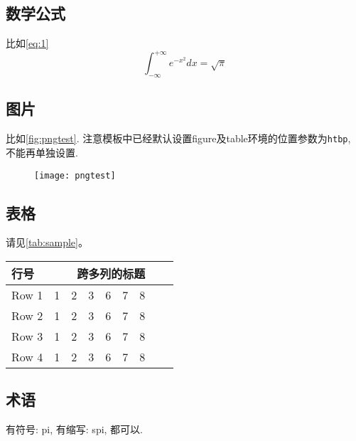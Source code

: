 \subsection{数学公式}

比如\autoref{eq:1}
\begin{equation}
    \label{eq:1}
    \int_{-\infty}^{+\infty} e^{-x^2} dx = \sqrt{\pi}
\end{equation}

\subsection{图片}

比如\autoref{fig:pngtest}. 注意模板中已经默认设置figure及table环境的位置参数为\verb|htbp|, 不能再单独设置.
\begin{figure}
    \centering
    \texttt{[image: pngtest]}
    \label{fig:pngtest}
\end{figure}

\subsection{表格}

请见\autoref{tab:sample}。
\begin{table}
    \label{tab:sample}
    \centering
    \setlength{\tabcolsep}{4pt}%
    \renewcommand{\arraystretch}{1.2}%
    \begin{tabular}{lcccccccc}
        \toprule
        行号 & \multicolumn{8}{c}{跨多列的标题}\\
        \midrule
        Row 1 & 1 & 2 & 3 & 6 & 7 & 8 \\
        Row 2 & 1 & 2 & 3 & 6 & 7 & 8 \\
        Row 3 & 1 & 2 & 3 & 6 & 7 & 8 \\
        Row 4 & 1 & 2 & 3 & 6 & 7 & 8 \\
        \bottomrule
    \end{tabular}
\end{table}

\subsection{术语}

有符号: \gls{pi}, 有缩写: \gls{spi}, 都可以.

